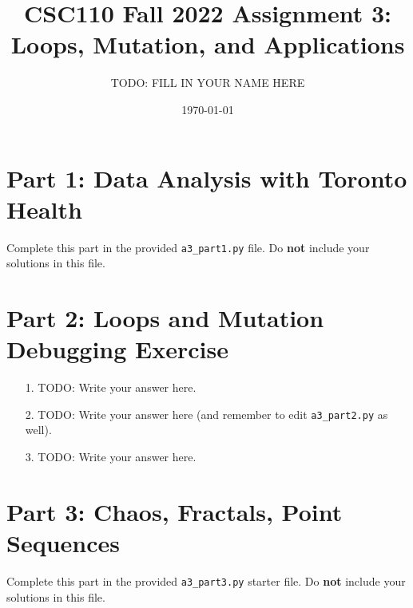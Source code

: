 \documentclass[11pt]{article}
\title{CSC110 Fall 2022 Assignment 3: Loops, Mutation, and Applications}
\author{TODO: FILL IN YOUR NAME HERE}
\date{\today}
\begin{document}
\maketitle

\section*{Part 1: Data Analysis with Toronto Health}

Complete this part in the provided \texttt{a3\_part1.py} file.
Do \textbf{not} include your solutions in this file.

\section*{Part 2: Loops and Mutation Debugging Exercise}

\begin{enumerate}
\item[1.]
TODO: Write your answer here.

\item[2.]
TODO: Write your answer here (and remember to edit \texttt{a3\_part2.py} as well).

\item[3.]
TODO: Write your answer here.
\end{enumerate}

\section*{Part 3: Chaos, Fractals, Point Sequences}

Complete this part in the provided \texttt{a3\_part3.py} starter file.
Do \textbf{not} include your solutions in this file.
\end{document}
